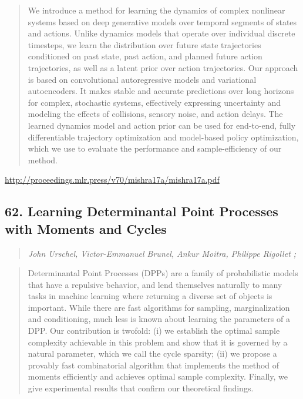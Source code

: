 \documentclass{article}
\begin{document}
\begin{quote}
    We introduce a method for learning the dynamics of complex nonlinear systems based on deep generative models over temporal segments of states and actions. Unlike dynamics models that operate over individual discrete timesteps, we learn the distribution over future state trajectories conditioned on past state, past action, and planned future action trajectories, as well as a latent prior over action trajectories. Our approach is based on convolutional autoregressive models and variational autoencoders. It makes stable and accurate predictions over long horizons for complex, stochastic systems, effectively expressing uncertainty and modeling the effects of collisions, sensory noise, and action delays. The learned dynamics model and action prior can be used for end-to-end, fully differentiable trajectory optimization and model-based policy optimization, which we use to evaluate the performance and sample-efficiency of our method.  \end{quote}

\href{http://proceedings.mlr.press/v70/mishra17a/mishra17a.pdf}{http://proceedings.mlr.press/v70/mishra17a/mishra17a.pdf}

\subsection{62. Learning Determinantal Point Processes with Moments and Cycles}

\begin{quote}
\footnotesize{\textit{John Urschel, Victor-Emmanuel Brunel, Ankur Moitra, Philippe Rigollet ;}}
\end{quote}

\begin{quote}
    Determinantal Point Processes (DPPs) are a family of probabilistic models that have a repulsive behavior, and lend themselves naturally to many tasks in machine learning where returning a diverse set of objects is important. While there are fast algorithms for sampling, marginalization and conditioning, much less is known about learning the parameters of a DPP. Our contribution is twofold: (i) we establish the optimal sample complexity achievable in this problem and show that it is governed by a natural parameter, which we call the cycle sparsity; (ii) we propose a provably fast combinatorial algorithm that implements the method of moments efficiently and achieves optimal sample complexity. Finally, we give experimental results that confirm our theoretical findings.  \end{quote}
\end{document}
